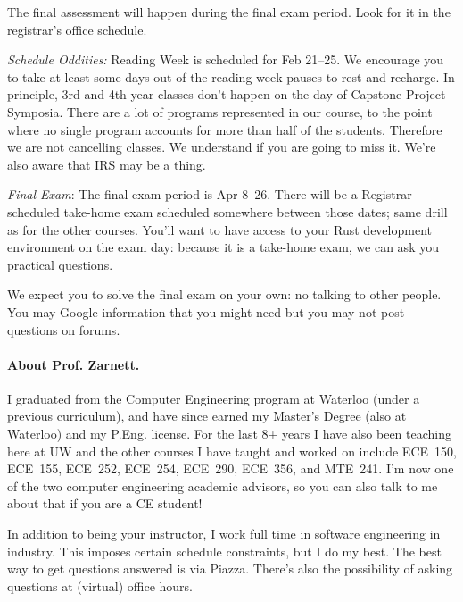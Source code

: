 \documentclass[letterpaper,10pt]{article}
\begin{document}
The final assessment will happen during the final exam period. Look for it in the registrar's office schedule.

\textit{Schedule Oddities:} Reading Week is scheduled for Feb 21--25. We encourage you to take at least some days out of the reading week pauses to rest and recharge. In principle, 3rd and 4th year classes don't happen on the day of Capstone Project Symposia. There are a lot of programs represented in our course, to the point where no single program accounts for more than half of the students. Therefore we are not cancelling classes. We understand if you are going to miss it. We're also aware that IRS may be a thing.

\textit{Final Exam}: The final exam period is Apr 8--26. There will be a Registrar-scheduled take-home exam scheduled somewhere between those dates; same drill as for the other courses. You'll want to have access to your Rust development environment on the exam day: because it is a take-home exam, we can ask you practical questions.

We expect you to solve the final exam on your own: no talking to other people. You may Google information that you might need but you may not post questions on forums.


\paragraph{About Prof. Zarnett.}
I graduated from the Computer Engineering program at Waterloo (under a previous curriculum), and have since earned my Master's Degree (also at Waterloo) and my P.Eng. license. For the last 8+ years I have also been teaching here at UW and the other courses I have taught and worked on include ECE~150, ECE~155, ECE~252, ECE~254, ECE~290, ECE~356, and MTE~241. I'm now one of the two computer engineering academic advisors, so you can also talk to me about that if you are a CE student! 

In addition to being your instructor, I work full time in software engineering in industry. This imposes certain schedule constraints, but I do my best. The best way to get questions answered is via Piazza. There's also the possibility of asking questions at (virtual) office hours.
\end{document}
